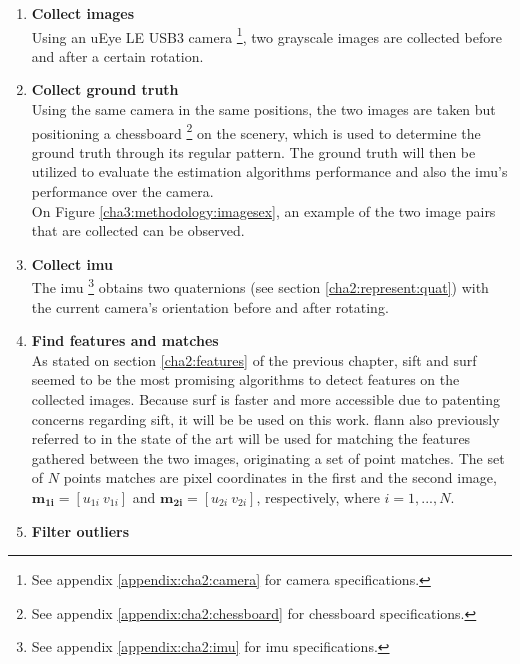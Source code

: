 \begin{enumerate}
	\item \textbf{Collect images}\\
	Using an uEye LE USB3 camera \footnote{See appendix \ref{appendix:cha2:camera} for camera specifications.}, two grayscale images are collected before and after a certain rotation.
	
	\item \textbf{Collect ground truth}\\
	Using the same camera in the same positions, the two images are taken but positioning a chessboard \footnote{See appendix \ref{appendix:cha2:chessboard} for chessboard specifications.} on the scenery, which is used to determine the ground truth through its regular pattern. The ground truth will then be utilized to evaluate the estimation algorithms performance and also the \acrshort{imu}'s performance over the camera.\\
	
	On Figure \ref{cha3:methodology:imagesex}, an example of the two image pairs that are collected can be observed.
	

	
	\item \textbf{Collect \acrshort{imu}}\\
	The \acrlong{imu} \footnote{See appendix \ref{appendix:cha2:imu} for \acrshort{imu} specifications.} obtains two quaternions (see section \ref{cha2:represent:quat}) with the current camera's orientation before and after rotating.
	
	\item \textbf{Find features and matches}\\
	As stated on section \ref{cha2:features} of the previous chapter,
	\acrshort{sift} and \acrshort{surf} seemed to be the most promising algorithms to detect features on the collected images. Because \acrshort{surf} is faster and more accessible due to patenting concerns regarding \acrshort{sift}, it will be be used on this work.
	\acrshort{flann} also previously referred to in the state of the art will be used for matching the features gathered between the two images, originating a set of point matches. The set of $N$ points matches are pixel coordinates in the first and the second image, $\mathbf{m_{1i}} = [u_{1i} \ v_{1i}]$ and $\mathbf{m_{2i}} = [u_{2i} \ v_{2i}]$, respectively, where $i=1,...,N$.
	
	\item \textbf{Filter outliers}\\
	
\end{enumerate}


